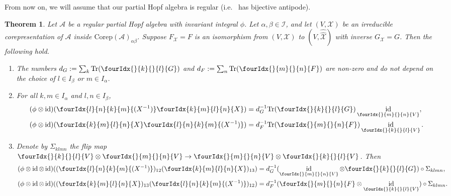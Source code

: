 \documentclass[10pt]{article}
\DeclareMathOperator{\id}{id}
\newcommand{\Corep}{\mathrm{Corep}}
\newcommand{\Tr}{\mathrm{Tr}}
\newcommand{\Gr}[5]{\fourIdx{#2}{#4}{#3}{#5}{#1}}%
\newcommand{\Gru}[3]{\Gr{#1}{}{}{#2}{#3}}
\newtheorem{Theorem}{Theorem}[section]
\theoremstyle{definition}
\numberwithin{equation}{section}
\begin{document}
From now on, we will assume that our partial Hopf algebra is regular (i.e.~ has bijective antipode).

\begin{Theorem} \label{thm:rep-orthogonality} Let $\mathscr{A}$ be a
  regular partial Hopf algebra with invariant integral $\phi$. Let $\alpha,\beta\in \mathscr{I}$, and let $(V,\mathscr{X})$
  be an irreducible corepresentation of $\mathscr{A}$ inside $\Corep(\mathscr{A})_{\alpha\beta}$. Suppose
  $F_{\mathscr{X}}=F$ is an isomorphism from $(V,\mathscr{X})$ to
  $(V,\hat{\hat{\mathscr{X}}})$ with inverse
  $G_{\mathscr{X}}= G$. Then the following hold.
  \begin{enumerate}[label=(\arabic*)]
  \item The numbers $d_G:=\sum_{k} \Tr (\Gru{G}{k}{l})$ and $d_F:=\sum_{n} \Tr (\Gru{F}{m}{n})$ are non-zero and do not depend on the choice of $l \in I_\beta$ or $m\in I_\alpha$.
    \item  For all $k,m \in I_\alpha$ and $l,n\in I_\beta$,
    \begin{align*}
      (\phi \otimes \id)(\Gr{(X^{-1})}{l}{k}{n}{m}\Gr{X}{k}{l}{m}{n})
      &=d_G^{-1}\Tr(\Gru{G}{k}{l})
      \id_{\Gru{V}{m}{n}}, \\
      (\phi \otimes \id)(\Gr{X}{k}{l}{m}{n}\Gr{(X^{-1})}{l}{k}{n}{m})
      &=d_F^{-1}\Tr(\Gru{F}{m}{n})
      \id_{\Gru{V}{k}{l}}.
    \end{align*}
  \item Denote by $\Sigma_{klmn}$ the flip map $\Gru{V}{k}{l}
    \otimes \Gru{V}{m}{n} \to \Gru{V}{m}{n}
    \otimes \Gru{V}{k}{l}$. Then
 \begin{align*}
   (\phi \otimes \id \otimes
   \id)((\Gr{(X^{-1})}{l}{k}{n}{m})_{12}(\Gr{X}{k}{l}{m}{n})_{13}) &=
   d_G^{-1}
   (\id_{\Gru{V}{m}{n}} \otimes \Gru{G}{k}{l})
   \circ \Sigma_{klmn}, \\
   (\phi \otimes \id \otimes
   \id)((\Gr{X}{k}{l}{m}{n})_{13}(\Gr{(X^{-1})}{l}{k}{n}{m})_{12}) &= d_F^{-1} (\Gru{F}{m}{n}
   \otimes \id_{\Gru{V}{k}{l}}) \circ \Sigma_{klmn}.
 \end{align*}
\end{enumerate}
  \end{Theorem}
\end{document}
